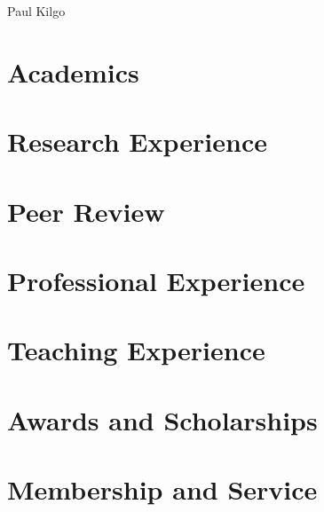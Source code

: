 \documentclass[12pt,oldfontcommands]{memoir}
\begin{document}
\begin{center}
  \Huge{Paul Kilgo}
\end{center}
\thispagestyle{fancy}

\section*{Academics}


\section*{Research Experience}




\section*{Peer Review}


\section*{Professional Experience}


\section*{Teaching Experience}


\section*{Awards and Scholarships}


\section*{Membership and Service}

\end{document}
